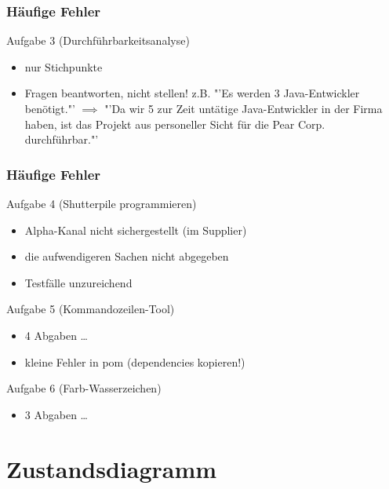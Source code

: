 \documentclass[18pt]{beamer}
\begin{document}
	\begin{frame}
		\frametitle{Häufige Fehler}
		\begin{block}{Aufgabe 3 (Durchführbarkeitsanalyse)}
			\begin{itemize}
				\item nur Stichpunkte
				\pause
				\item Fragen beantworten, nicht stellen!
				\linebreak z.B. "'Es werden 3 Java-Entwickler benötigt."' $\implies$
				"'Da wir 5 zur Zeit untätige Java-Entwickler in der Firma haben, ist das Projekt aus personeller Sicht für die Pear Corp. durchführbar."'
			\end{itemize}
		\end{block}
	\end{frame}

	\begin{frame}
		\frametitle{Häufige Fehler}
		\begin{block}{Aufgabe 4 (Shutterpile programmieren)}
			\begin{itemize}
				\item Alpha-Kanal nicht sichergestellt (im Supplier)
				\pause
				\item die aufwendigeren Sachen nicht abgegeben
				\pause
				\item Testfälle unzureichend
			\end{itemize}
		\end{block}
	
	\begin{block}{Aufgabe 5 (Kommandozeilen-Tool)}
		\begin{itemize}
			\item 4 Abgaben \dots
			\item kleine Fehler in pom (dependencies kopieren!)
		\end{itemize}
	\end{block}

	\begin{block}{Aufgabe 6 (Farb-Wasserzeichen)}
		\begin{itemize}
			\item 3 Abgaben \dots
		\end{itemize}
	\end{block}
\end{frame}

\section{Zustandsdiagramm}
\end{document}
